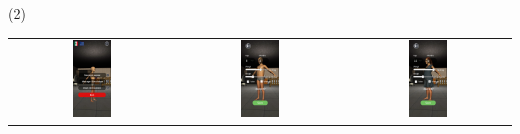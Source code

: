 \begin{frame}{ (2)}
\begin{center}
     \begin{tabular}{ccc}
         \includegraphics[width=0.25\textwidth]{Figs/Echartea1}&
         \includegraphics[width=0.25\textwidth]{Figs/Echartea2}&
         \includegraphics[width=0.25\textwidth]{Figs/Echartea3}\\
          \end{tabular}
\end{center}
\end{frame}

